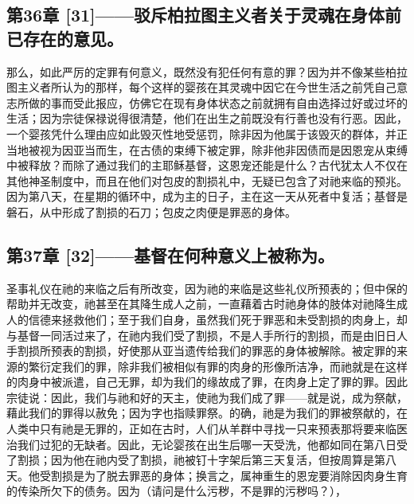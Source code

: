
\subsection{第36章 [31]——驳斥柏拉图主义者关于灵魂在身体前已存在的意见。}

那么，如此严厉的定罪有何意义，既然没有犯任何有意的罪？因为并不像某些柏拉图主义者所认为的那样，每个这样的婴孩在其灵魂中因它在今世生活之前凭自己意志所做的事而受此报应，仿佛它在现有身体状态之前就拥有自由选择过好或过坏的生活；因为宗徒保禄说得很清楚，他们在出生之前既没有行善也没有行恶。因此，一个婴孩凭什么理由应如此毁灭性地受惩罚，除非因为他属于该毁灭的群体，并正当地被视为因亚当而生，在古债的束缚下被定罪，除非他非因债而是因恩宠从束缚中被释放？而除了通过我们的主耶稣基督，这恩宠还能是什么？古代犹太人不仅在其他神圣制度中，而且在他们对包皮的割损礼中，无疑已包含了对祂来临的预兆。因为第八天，在星期的循环中，成为主的日子，主在这一天从死者中复活；基督是磐石，从中形成了割损的石刀；包皮之肉便是罪恶的身体。\par


\subsection{第37章 [32]——基督在何种意义上被称为。}

圣事礼仪在祂的来临之后有所改变，因为祂的来临是这些礼仪所预表的；但中保的帮助并无改变，祂甚至在其降生成人之前，一直藉着古时祂身体的肢体对祂降生成人的信德来拯救他们；至于我们自身，虽然我们死于罪恶和未受割损的肉身上，却与基督一同活过来了，在祂内我们受了割损，不是人手所行的割损，而是由旧日人手割损所预表的割损，好使那从亚当遗传给我们的罪恶的身体被解除。被定罪的来源的繁衍定我们的罪，除非我们被相似有罪的肉身的形像所洁净，而祂就是在这样的肉身中被派遣，自己无罪，却为我们的缘故成了罪，在肉身上定了罪的罪。因此宗徒说：因此，我们与祂和好的天主，使祂为我们成了罪——就是说，成为祭献，藉此我们的罪得以赦免；因为字也指赎罪祭。的确，祂是为我们的罪被祭献的，在人类中只有祂是无罪的，正如在古时，人们从羊群中寻找一只来预表那将要来临医治我们过犯的无缺者。因此，无论婴孩在出生后哪一天受洗，他都如同在第八日受了割损；因为他在祂内受了割损，祂被钉十字架后第三天复活，但按周算是第八天。他受割损是为了脱去罪恶的身体；换言之，属神重生的恩宠要消除因肉身生育的传染所欠下的债务。因为（请问是什么污秽，不是罪的污秽吗？），\par

